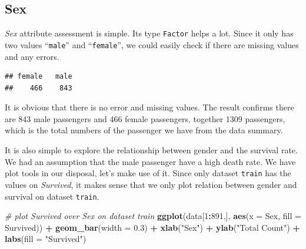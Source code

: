 \documentclass[
]{book}
\newenvironment{Shaded}{\begin{snugshade}}{\end{snugshade}}
\newcommand{\CommentTok}[1]{\textcolor[rgb]{0.56,0.35,0.01}{\textit{#1}}}
\newcommand{\DataTypeTok}[1]{\textcolor[rgb]{0.13,0.29,0.53}{#1}}
\newcommand{\DecValTok}[1]{\textcolor[rgb]{0.00,0.00,0.81}{#1}}
\newcommand{\FloatTok}[1]{\textcolor[rgb]{0.00,0.00,0.81}{#1}}
\newcommand{\KeywordTok}[1]{\textcolor[rgb]{0.13,0.29,0.53}{\textbf{#1}}}
\newcommand{\NormalTok}[1]{#1}
\newcommand{\OperatorTok}[1]{\textcolor[rgb]{0.81,0.36,0.00}{\textbf{#1}}}
\newcommand{\StringTok}[1]{\textcolor[rgb]{0.31,0.60,0.02}{#1}}
\begin{document}
\hypertarget{sex}{%
\subsection*{Sex}\label{sex}}


\emph{Sex} attribute assessment is simple. Its type \texttt{Factor} helps a lot. Since it only has two values ``\texttt{male}'' and ``\texttt{female}'', we could easily check if there are missing values and any errors.

\begin{Shaded}
\end{Shaded}

\begin{verbatim}
## female   male 
##    466    843
\end{verbatim}

It is obvious that there is no error and missing values. The result confirms there are 843 male passengers and 466 female passengers, together 1309 passengers, which is the total numbers of the passenger we have from the data summary.

It is also simple to explore the relationship between gender and the survival rate. We had an assumption that the male passenger have a high death rate. We have plot tools in our disposal, let's make use of it. Since only dataset \texttt{train} has the values on \emph{Survived}, it makes sense that we only plot relation between gender and survival on dataset \texttt{train}.

\begin{Shaded}
\begin{Highlighting}[]
\CommentTok{# plot Survived over Sex on dataset train}
\KeywordTok{ggplot}\NormalTok{(data[}\DecValTok{1}\OperatorTok{:}\DecValTok{891}\NormalTok{,], }\KeywordTok{aes}\NormalTok{(}\DataTypeTok{x =}\NormalTok{ Sex, }\DataTypeTok{fill =}\NormalTok{ Survived)) }\OperatorTok{+}
\StringTok{  }\KeywordTok{geom_bar}\NormalTok{(}\DataTypeTok{width =} \FloatTok{0.3}\NormalTok{) }\OperatorTok{+}
\StringTok{  }\KeywordTok{xlab}\NormalTok{(}\StringTok{"Sex"}\NormalTok{) }\OperatorTok{+}
\StringTok{  }\KeywordTok{ylab}\NormalTok{(}\StringTok{"Total Count"}\NormalTok{) }\OperatorTok{+}
\StringTok{  }\KeywordTok{labs}\NormalTok{(}\DataTypeTok{fill =} \StringTok{"Survived"}\NormalTok{)}
\end{Highlighting}
\end{Shaded}
\end{document}
